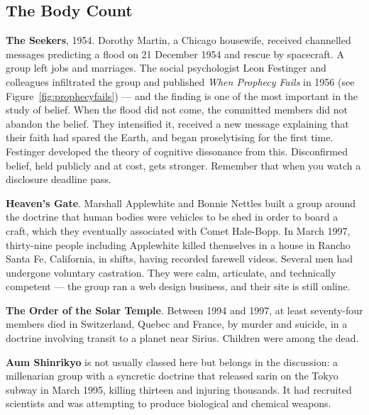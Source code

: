 \Needspace*{0.40\textheight}
\subsection{The Body Count}\label{sec:cultbodycount}

\textbf{The Seekers}, 1954. Dorothy Martin, a Chicago housewife, received channelled messages
predicting a flood on 21 December 1954 and rescue by spacecraft. A group left jobs and
marriages. The social psychologist Leon Festinger and colleagues infiltrated the group and
published \emph{When Prophecy Fails} in 1956 (see Figure~\ref{fig:prophecyfails}) --- and the finding is one of the most important in
the study of belief. When the flood did not come, the committed members did not abandon the
belief. They intensified it, received a new message explaining that their faith had spared the
Earth, and began proselytising for the first time. Festinger developed the theory of cognitive
dissonance from this. Disconfirmed belief, held publicly and at cost, gets stronger. Remember
that when you watch a disclosure deadline pass.

\textbf{Heaven's Gate}. Marshall Applewhite and Bonnie Nettles built a group around the doctrine
that human bodies were vehicles to be shed in order to board a craft, which they eventually
associated with Comet Hale-Bopp. In March 1997, thirty-nine people including Applewhite killed
themselves in a house in Rancho Santa Fe, California, in shifts, having recorded farewell
videos. Several men had undergone voluntary castration. They were calm, articulate, and
technically competent --- the group ran a web design business, and their site is still online.

\textbf{The Order of the Solar Temple}. Between 1994 and 1997, at least seventy-four members died
in Switzerland, Quebec and France, by murder and suicide, in a doctrine involving transit to a
planet near Sirius. Children were among the dead.

\textbf{Aum Shinrikyo} is not usually classed here but belongs in the discussion: a
millenarian group with a syncretic doctrine that released sarin on the Tokyo subway in March
1995, killing thirteen and injuring thousands. It had recruited scientists and was attempting
to produce biological and chemical weapons.

